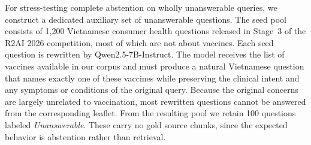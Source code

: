 \documentclass[sn-mathphys, oneside]{sn-jnl}
\begin{document}
For stress-testing complete abstention on wholly unanswerable queries, we construct a dedicated auxiliary set of unanswerable questions. The seed pool consists of 1,200 Vietnamese consumer health questions released in Stage~3 of the R2AI 2026 competition, most of which are not about vaccines. Each seed question is rewritten by Qwen2.5-7B-Instruct. The model receives the list of vaccines available in our corpus and must produce a natural Vietnamese question that names exactly one of these vaccines while preserving the clinical intent and any symptoms or conditions of the original query. Because the original concerns are largely unrelated to vaccination, most rewritten questions cannot be answered from the corresponding leaflet. From the resulting pool we retain 100 questions labeled \emph{Unanswerable}. These carry no gold source chunks, since the expected behavior is abstention rather than retrieval.
\end{document}
